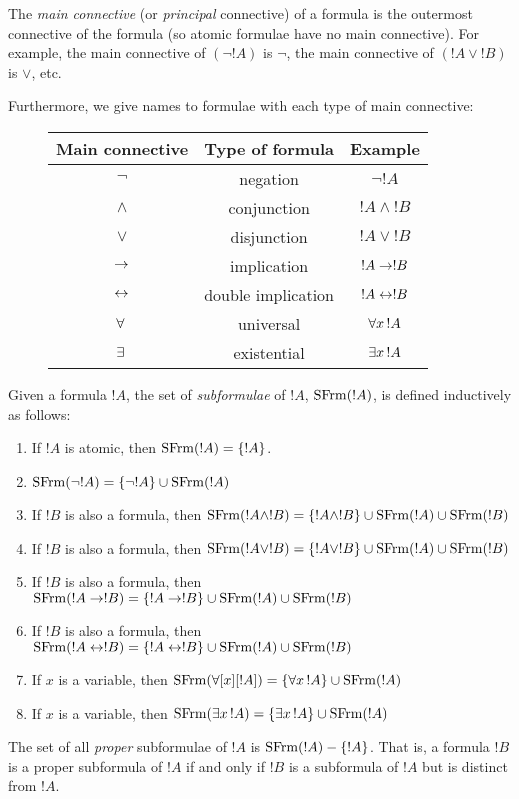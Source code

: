 \documentclass[open-logic-section]{subfiles}
\begin{document}
\begin{defn}
The \emph{main connective} (or \emph{principal} connective) of a
formula is the outermost connective of the formula (so atomic formulae
have no main connective). For example, the main connective of $(\lnot
!A)$ is $\lnot$, the main connective of $(!A \lor !B)$ is $\lor$, etc.

Furthermore, we give names to formulae with each type of main connective:

\begin{figure}[!h]
\centering
\begin{tabular}{| c | c | c |}
\hline
Main connective & Type of formula & Example\\
\hline
$\lnot$ & negation & $\lnot !A$ \\
$\land$ & conjunction & $!A \land !B$ \\
$\lor$ & disjunction & $!A \lor !B$ \\
$\to$ & implication & $!A \to !B$ \\
$\leftrightarrow$ & double implication & $!A \leftrightarrow !B$ \\
$\lforall[][]$ & universal & $\lforall[x][!A]$ \\
$\lexists[][]$ & existential & $\lexists[x][!A]$\\ \hline
\end{tabular}
\end{figure}

\end{defn}

\begin{defn}[Subformula]
Given a formula $!A$, the set of \emph{subformulae} of $!A$,
$\mathrm{SFrm}({!A})$, is defined inductively as follows:
\begin{enumerate}
\item If $!A$ is atomic, then $\mathrm{SFrm}({!A}) = \{!A\}$.
\item $\mathrm{SFrm}({\lnot !A}) = \{\lnot !A\} \cup \mathrm{SFrm}({!A})$
\item If $!B$ is also a formula, then $\mathrm{SFrm}({!A \land !B}) = \{!A \land !B\} \cup \mathrm{SFrm}({!A}) \cup \mathrm{SFrm}({!B})$
\item If $!B$ is also a formula, then $\mathrm{SFrm}({!A \lor !B}) = \{!A \lor !B\} \cup \mathrm{SFrm}({!A}) \cup \mathrm{SFrm}({!B})$
\item If $!B$ is also a formula, then $\mathrm{SFrm}({!A \to !B}) = \{!A \to !B\} \cup \mathrm{SFrm}({!A}) \cup \mathrm{SFrm}({!B})$
\item If $!B$ is also a formula, then $\mathrm{SFrm}({!A \leftrightarrow !B}) = \{!A \leftrightarrow !B\} \cup \mathrm{SFrm}({!A}) \cup \mathrm{SFrm}({!B})$
\item If $x$ is a variable, then $\SubFrm{\forall[x][!A]} = \{\lforall[x][!A]\} \cup \SubFrm{!A}$
\item If $x$ is a variable, then $\SubFrm{\lexists[x][!A]} = \{\lexists[x][!A]\} \cup \SubFrm{!A}$
\end{enumerate}
The set of all \emph{proper} subformulae of $!A$ is $\mathrm{SFrm}({!A}) -
\{!A\}$. That is, a formula $!B$ is a proper subformula of $!A$ if and
only if $!B$ is a subformula of $!A$ but is distinct from $!A$.
\end{defn}
\end{document}
